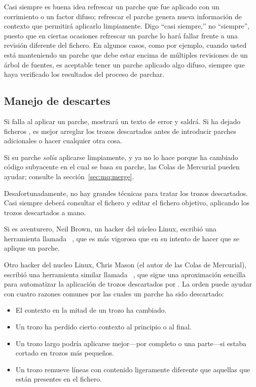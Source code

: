 Casi siempre es buena idea refrescar un parche que fue aplicado con un
corrimiento o un factor difuso; refrescar el parche genera nueva
información de contexto que permitirá aplicarlo limpiamente.  Digo
``casi siempre,'' no ``siempre'', puesto que en ciertas ocasiones
refrescar un parche lo hará fallar frente a una revisión diferente del
fichero.  En algunos casos, como por ejemplo, cuando usted está
manteniendo un parche que debe estar encima de múltiples revisiones de
un árbol de fuentes, es aceptable tener un parche aplicado algo
difuso, siempre que haya verificado los resultados del proceso de
parchar.

\subsection{Manejo de descartes}

Si  falla al aplicar un parche, mostrará un texto de
error y saldrá.  Si ha dejado ficheros , es mejor
arreglar los trozos descartados antes de introducir parches
adicionales o hacer cualquier otra cosa.

Si su parche \emph{solía} aplicarse limpiamente, y ya no lo hace
porque ha cambiado código subyacente en el cual se basa su parche, las
Colas de Mercurial pueden ayudar; consulte la sección~\ref{sec:mq:merge}.

Desafortunadamente, no hay grandes técnicas para tratar los trozos
descartados.  Casi siempre deberá consultar el fichero
 y editar el fichero objetivo, aplicando los trozos
descartados a mano.

Si es aventurero, Neil Brown, un hacker del núcleo Linux, escribió una
herramienta llamada ~\cite{web:wiggle}, que es más
vigorosa que  en su intento de hacer que se aplique un
parche.

Otro hacker del nucleo Linux, Chris Mason (el autor de las Colas de
Mercurial), escribió una herramienta similar llamada
~\cite{web:mpatch}, que sigue una aproximación
sencilla para automatizar la aplicación de trozos descartados por
.  La orden  puede ayudar con cuatro
razones comunes por las cuales un parche ha sido descartado:

\begin{itemize}
\item El contexto en la mitad de un trozo ha cambiado.
\item Un trozo ha perdido cierto contexto al principio o al final.
\item Un trozo largo podría aplicarse mejor---por completo o una
  parte---si estaba cortado en trozos más pequeños.
\item Un trozo remueve líneas con contenido ligeramente diferente que
  aquellas que están presentes en el fichero.
\end{itemize}

